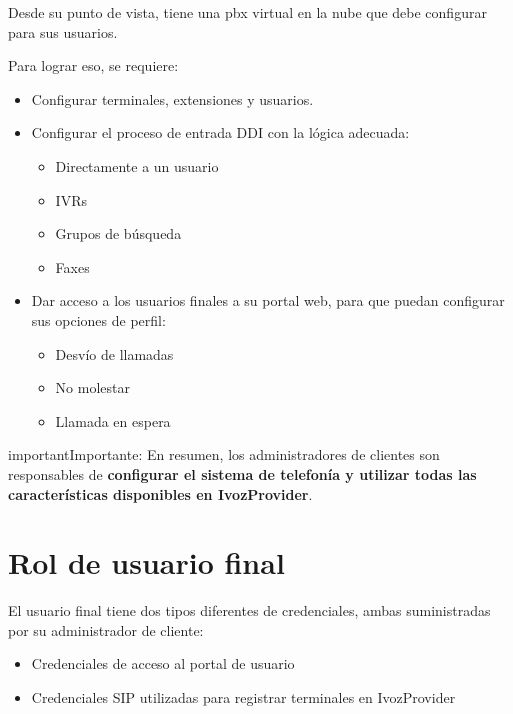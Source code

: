 \documentclass[letterpaper,10pt,spanish]{sphinxmanual}
\begin{document}
Desde su punto de vista, tiene una pbx virtual en la nube que debe configurar para sus usuarios.

Para lograr eso, se requiere:
\begin{itemize}
\item {} 
Configurar terminales, extensiones y usuarios.

\item {} 
Configurar el proceso de entrada DDI con la lógica adecuada:
\begin{itemize}
\item {} 
Directamente a un usuario

\item {} 
IVRs

\item {} 
Grupos de búsqueda

\item {} 
Faxes

\end{itemize}

\item {} 
Dar acceso a los usuarios finales a su portal web, para que puedan configurar sus opciones de perfil:
\begin{itemize}
\item {} 
Desvío de llamadas

\item {} 
No molestar

\item {} 
Llamada en espera

\end{itemize}

\end{itemize}

\begin{notice}{important}{Importante:}
En resumen, los administradores de clientes son responsables de \textbf{configurar el sistema de telefonía y utilizar todas las características disponibles en IvozProvider}.
\end{notice}


\section{Rol de usuario final}
\label{basic_concepts/operation_roles/index:final-user-role}
El usuario final tiene dos tipos diferentes de credenciales, ambas suministradas por su administrador de cliente:
\begin{itemize}
\item {} 
Credenciales de acceso al portal de usuario

\item {} 
Credenciales SIP utilizadas para registrar terminales en IvozProvider

\end{itemize}
\end{document}
